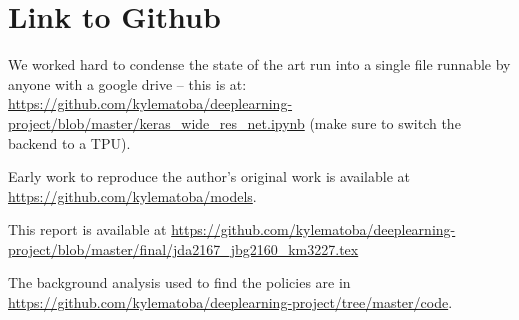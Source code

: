 \documentclass[10pt,twocolumn,letterpaper]{article}
\begin{document}
\section{Link to Github}

  We worked hard to condense the state of the art run into a single file runnable by anyone with a google drive -- this is at: \url{https://github.com/kylematoba/deeplearning-project/blob/master/keras_wide_res_net.ipynb} (make sure to switch the backend to a TPU).

  Early work to reproduce the author's original work is available at \url{https://github.com/kylematoba/models}. 

  This report is available at \url{https://github.com/kylematoba/deeplearning-project/blob/master/final/jda2167_jbg2160_km3227.tex}

  The background analysis used to find the policies are in \url{https://github.com/kylematoba/deeplearning-project/tree/master/code}.

\nocite{Torralba2008}
{\small


}
\end{document}
